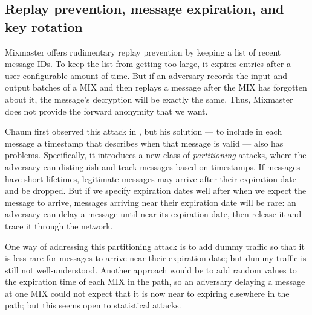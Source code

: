 \documentclass{llncs}
\begin{document}
\subsection{Replay prevention, message expiration, and key rotation}

Mixmaster offers rudimentary replay prevention by keeping a list of recent
message IDs. To keep the list from getting too large, it expires entries
after a user-configurable amount of time. But if an adversary records
the input and output batches of a MIX and then replays a message after
the MIX has forgotten about it, the message's decryption will be exactly
the same. Thus, Mixmaster does not provide the forward anonymity that we want.

Chaum first observed this attack in \cite{chaum-mix}, but his solution
--- to include in each message a timestamp that describes when that message
is valid --- also has problems. Specifically, it introduces a new class
of \emph{partitioning} attacks, where the adversary can distinguish and
track messages based on timestamps. If messages have short lifetimes,
legitimate messages may arrive after their expiration date and be
dropped. But if we specify expiration dates well after when we expect the
message to arrive, messages arriving near their expiration date will be
rare: an adversary can delay a message until near its expiration date,
then release it and trace it through the network.


One way of addressing this partitioning attack is to add dummy traffic
so that it is less rare for messages to arrive near their expiration date;
but dummy traffic is still not well-understood. Another approach would
be to add random values to the expiration time of each MIX in the path,
so an adversary delaying a message at one MIX could not expect that it
is now near to expiring elsewhere in the path; but this seems open to
statistical attacks.

\end{document}
